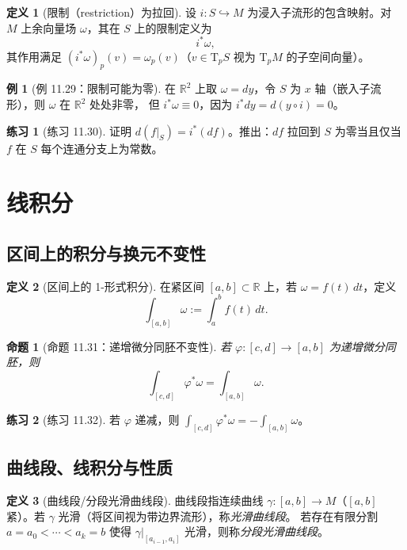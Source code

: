 \documentclass[12pt,a4paper]{article}
\theoremstyle{definition}
\newtheorem{definition}{定义}[section]
\newtheorem{example}{例}[section]
\newtheorem{exercise}{练习}[section]
\theoremstyle{plain}
\newtheorem{proposition}{命题}[section]
\newcommand{\R}{\mathbb{R}}
\newcommand{\Tp}[1]{\mathrm{T}_{#1}}
\begin{document}
\begin{definition}[限制（restriction）为拉回]
设 $i:S\hookrightarrow M$ 为浸入子流形的包含映射。对 $M$ 上余向量场 $\omega$，其在 $S$ 上的限制定义为
\[
i^*\omega,
\]
其作用满足 $(i^*\omega)_p(v)=\omega_p(v)$（$v\in\Tp{p}S$ 视为 $\Tp{p}M$ 的子空间向量）。
\end{definition}

\begin{example}[例 11.29：限制可能为零]
在 $\R^2$ 上取 $\omega=dy$，令 $S$ 为 $x$ 轴（嵌入子流形），则 $\omega$ 在 $\R^2$ 处处非零，
但 $i^*\omega\equiv 0$，因为 $i^*dy=d(y\circ i)=0$。
\end{example}

\begin{exercise}[练习 11.30]
证明 $d(f|_S)=i^*(df)$。推出：$df$ 拉回到 $S$ 为零当且仅当 $f$ 在 $S$ 每个连通分支上为常数。
\end{exercise}

\section{线积分}

\subsection{区间上的积分与换元不变性}

\begin{definition}[区间上的 1-形式积分]
在紧区间 $[a,b]\subset\R$ 上，若 $\omega=f(t)\,dt$，定义
\[
\int_{[a,b]}\omega := \int_a^b f(t)\,dt.
\]
\end{definition}

\begin{proposition}[命题 11.31：递增微分同胚不变性]
若 $\varphi:[c,d]\to[a,b]$ 为递增微分同胚，则
\[
\int_{[c,d]}\varphi^*\omega = \int_{[a,b]}\omega.
\]
\end{proposition}

\begin{exercise}[练习 11.32]
若 $\varphi$ 递减，则 $\int_{[c,d]}\varphi^*\omega = -\int_{[a,b]}\omega$。
\end{exercise}

\subsection{曲线段、线积分与性质}

\begin{definition}[曲线段/分段光滑曲线段]
曲线段指连续曲线 $\gamma:[a,b]\to M$（$[a,b]$ 紧）。若 $\gamma$ 光滑（将区间视为带边界流形），称\emph{光滑曲线段}。
若存在有限分割 $a=a_0<\cdots<a_k=b$ 使得 $\gamma|_{[a_{i-1},a_i]}$ 光滑，则称\emph{分段光滑曲线段}。
\end{definition}
\end{document}
